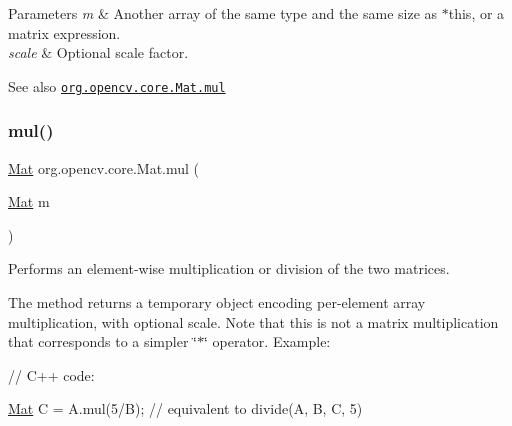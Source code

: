 {\ttfamily }

{\ttfamily 
\begin{DoxyParams}{Parameters}
{\em m} & Another array of the same type and the same size as {\ttfamily $\ast$this}, or a matrix expression. \\
\hline
{\em scale} & Optional scale factor.\\
\hline
\end{DoxyParams}
\begin{DoxySeeAlso}{See also}
\href{http://docs.opencv.org/modules/core/doc/basic_structures.html#mat-mul}{\tt org.\+opencv.\+core.\+Mat.\+mul} 
\end{DoxySeeAlso}
}\mbox{\label{classorg_1_1opencv_1_1core_1_1_mat_afa27812124a1a17a0b4c003637b7a27b}} 
\subsubsection{\texorpdfstring{mul()}{mul()}\hspace{0.1cm}{\footnotesize\ttfamily [2/2]}}
{\footnotesize\ttfamily \mbox{\hyperlink{classorg_1_1opencv_1_1core_1_1_mat}{Mat}} org.\+opencv.\+core.\+Mat.\+mul (\begin{DoxyParamCaption}\item[{\mbox{\hyperlink{classorg_1_1opencv_1_1core_1_1_mat}{Mat}}}]{m }\end{DoxyParamCaption})}

Performs an element-\/wise multiplication or division of the two matrices.

The method returns a temporary object encoding per-\/element array multiplication, with optional scale. Note that this is not a matrix multiplication that corresponds to a simpler \char`\"{}$\ast$\char`\"{} operator. Example\+: {\ttfamily }

{\ttfamily }

{\ttfamily }

{\ttfamily // C++ code\+:}

{\ttfamily }

{\ttfamily }

{\ttfamily \mbox{\hyperlink{classorg_1_1opencv_1_1core_1_1_mat}{Mat}} C = A.\+mul(5/B); // equivalent to divide(\+A, B, C, 5)}

{\ttfamily }

